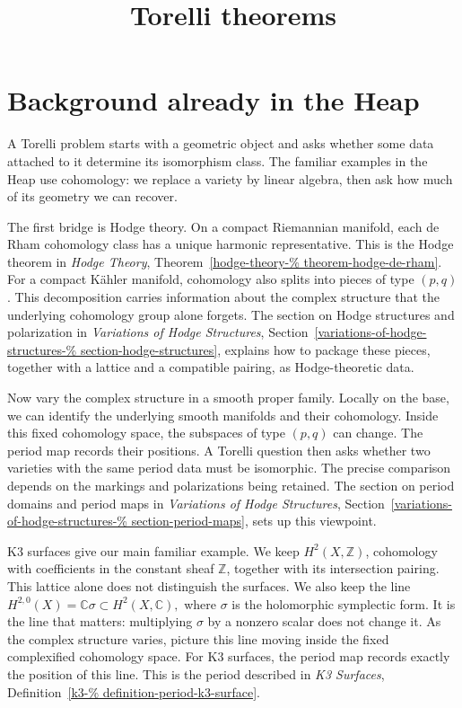 

\title{Torelli theorems}
\maketitle
\tableofcontents

\section{Background already in the Heap}
\label{section-background}

A Torelli problem starts with a geometric
object and asks whether some data attached
to it determine its isomorphism class.
The familiar examples in the Heap use
cohomology: we replace a variety by linear
algebra, then ask how much of its geometry
we can recover.

The first bridge is Hodge theory.
On a compact Riemannian manifold, each
de Rham cohomology class has a unique
harmonic representative. This is the
Hodge theorem in {\it Hodge Theory},
Theorem~\ref{hodge-theory-%
theorem-hodge-de-rham}.
For a compact K\"ahler manifold, cohomology
also splits into pieces of type $(p,q)$.
This decomposition carries information
about the complex structure that the
underlying cohomology group alone forgets.
The section on Hodge structures and
polarization in
{\it Variations of Hodge Structures},
Section~\ref{variations-of-hodge-structures-%
section-hodge-structures},
explains how to package these pieces,
together with a lattice and a compatible
pairing, as Hodge-theoretic data.

Now vary the complex structure in a
smooth proper family. Locally on the
base, we can identify the underlying
smooth manifolds and their cohomology.
Inside this fixed cohomology space,
the subspaces of type $(p,q)$ can change.
The period map records their positions.
A Torelli question then asks whether two
varieties with the same period data must
be isomorphic. The precise comparison
depends on the markings and
polarizations being retained.
The section on period domains and period
maps in
{\it Variations of Hodge Structures},
Section~\ref{variations-of-hodge-structures-%
section-period-maps},
sets up this viewpoint.

K3 surfaces give our main familiar
example. We keep $H^2(X,\mathbb{Z})$,
cohomology with coefficients in the
constant sheaf $\mathbb{Z}$, together with
its intersection pairing. This lattice
alone does not distinguish the surfaces.
We also keep the line
$
H^{2,0}(X)=\mathbb{C}\sigma
\subset H^2(X,\mathbb{C}),
$
where $\sigma$ is the holomorphic
symplectic form. It is the line that
matters: multiplying $\sigma$ by a
nonzero scalar does not change it.
As the complex structure varies, picture
this line moving inside the fixed
complexified cohomology space.
For K3 surfaces, the period map records
exactly the position of this line.
This is the period described
in {\it K3 Surfaces},
Definition~\ref{k3-%
definition-period-k3-surface}.

